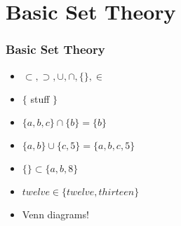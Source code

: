 \documentclass{beamer}
\begin{document}
\section{Basic Set Theory}
\frame
{
\frametitle{Basic Set Theory}

\begin{itemize}
    \item<1-> $\subset, \supset, \cup, \cap, \{\}, \in$
    \item<2-> $\{$ stuff $\}$
    \item<3-> $\{a,b,c\} \cap \{b\} = \{b\}$
    \item<4-> $\{a,b\} \cup \{c,5\} = \{a,b,c,5\}$
    \item<5-> $\{\} \subset \{a,b,8\}$
    \item<6-> $twelve \in \{twelve, thirteen\}$
    \item<7-> Venn diagrams!
\end{itemize}

}
\end{document}
